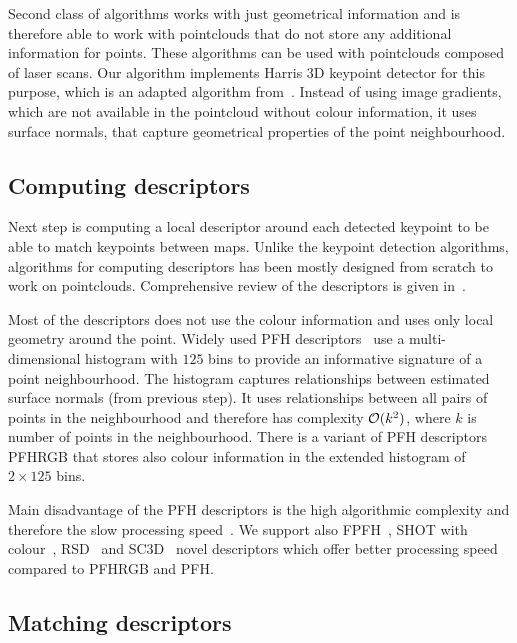 Second class of algorithms works with just geometrical information and is therefore able to work with pointclouds that do not store any additional information for points. These algorithms can be used with pointclouds composed of laser scans. Our algorithm implements Harris 3D keypoint detector for this purpose, which is an adapted algorithm from~\cite{harris1988combined}. Instead of using image gradients, which are not available in the pointcloud without colour information, it uses surface normals, that capture geometrical properties of the point neighbourhood.

\subsection{Computing descriptors}

Next step is computing a local descriptor around each detected keypoint to be able to match keypoints between maps. Unlike the keypoint detection algorithms, algorithms for computing descriptors has been mostly designed from scratch to work on pointclouds. Comprehensive review of the descriptors is given in~\cite{YasirThesis}.

Most of the descriptors does not use the colour information and uses only local geometry around the point. Widely used \gls{PFH} descriptors~\cite{rusu2008pfh} use a multi-dimensional histogram with $125$ bins to provide an informative signature of a point neighbourhood. The histogram captures relationships between estimated surface normals (from previous step). It uses relationships between all pairs of points in the neighbourhood and therefore has complexity $\operatorname{\mathcal{O}}(k^2)$, where $k$ is number of points in the neighbourhood. There is a variant of \gls{PFH} descriptors \gls{PFHRGB} that stores also colour information in the extended histogram of $2 \times 125$ bins.

Main disadvantage of the \gls{PFH} descriptors is the high algorithmic complexity and therefore the slow processing speed~\cite{rusu2009fpfh}. We support also \gls{FPFH}~\cite{rusu2009fpfh}, \gls{SHOT} with colour~\cite{tombari2011shot}, \gls{RSD}~\cite{marton2010rsd} and \gls{SC3D}~\cite{frome2004sc3d} novel descriptors which offer better processing speed compared to \gls{PFHRGB} and \gls{PFH}.

\subsection{Matching descriptors}

